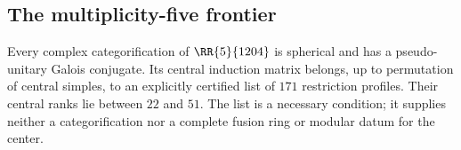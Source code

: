 \subsection{The multiplicity-five frontier}
\label{sec:frontier-1204}

\begin{proposition}\label{prop:1204-finite-profiles}
Every complex categorification of $\RR{5}{1204}$ is spherical and has a
pseudo-unitary Galois conjugate. Its central induction matrix belongs,
up to permutation of central simples, to an explicitly certified list of
$171$ restriction profiles. Their central ranks lie between $22$ and $51$.
The list is a necessary condition; it supplies neither a categorification
nor a complete fusion ring or modular datum for the center.
\end{proposition}

